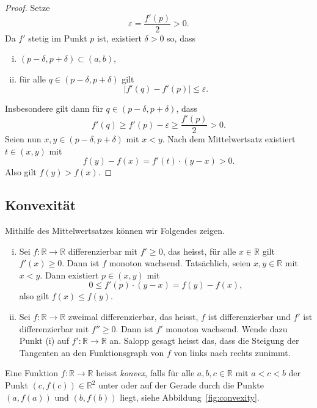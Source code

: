 \documentclass[../main.tex]{subfiles}
\begin{document}
\begin{proof}
  Setze
  \[
    \varepsilon = \frac{f'(p)}{2} > 0.
  \]
  Da $f'$ stetig im Punkt $p$ ist, existiert
  $\delta > 0$ so, dass
  \begin{enumerate}[(i)]
    \item $(p - \delta, p + \delta) \subset (a, b)$,
    \item für alle $q \in (p - \delta, p + \delta)$ 
      gilt
      \[
        |f'(q) - f'(p)| \leq \varepsilon.
      \]
  \end{enumerate}
  Insbesondere gilt dann für
  $q \in (p - \delta, p + \delta)$, dass
  \[
    f'(q) \geq f'(p) - \varepsilon \geq \frac{f'(p)}{2} > 0.
  \]
  Seien nun $x, y \in (p - \delta, p + \delta)$ mit
  $x < y$.
  Nach dem Mittelwertsatz existiert $t \in (x, y)$
  mit 
  \[f(y)  - f(x) = f'(t) \cdot (y - x) > 0. \]
  Also gilt $f(y) > f(x)$.
\end{proof}

\subsection*{Konvexität}
Mithilfe des Mittelwertsatzes können wir Folgendes zeigen.
\begin{enumerate}[(i)]
  \item 
    Sei $f \colon \mathbb{R} \to \mathbb{R}$ differenzierbar
    mit $f' \geq 0$, das heisst, für alle $x \in \mathbb{R}$ 
    gilt $f'(x) \geq 0$.
    Dann ist $f$ monoton wachsend.
    Tatsächlich, seien $x, y \in \mathbb{R}$ mit $x < y$.
    Dann existiert $p \in (x, y)$ mit
    \[
      0 \leq f'(p) \cdot (y - x) = f(y) - f(x),
    \]
    also gilt $f(x) \leq f(y)$.
  \item
    Sei $f \colon \mathbb{R} \to \mathbb{R}$ zweimal
    differenzierbar, das heisst, $f$ ist differenzierbar
    und $f'$ ist differenzierbar mit $f'' \geq 0$.
    Dann ist $f'$ monoton wachsend.
    Wende dazu Punkt (i) auf
    $f' \colon\mathbb{R} \to \mathbb{R}$ 
    an.
    Salopp gesagt heisst das,
    dass die Steigung der Tangenten an den
    Funktionsgraph von $f$ von links nach rechts
    zunimmt.
\end{enumerate}

\begin{definition}
  Eine Funktion $f \colon \mathbb{R} \to \mathbb{R}$ 
  heisst \emph{konvex}, falls für alle $a, b, c \in \mathbb{R}$ 
  mit $a < c < b$ der Punkt
  $(c, f(c))
  \in \mathbb{R}^2$ unter
  oder auf der Gerade durch die Punkte
  $(a, f(a))$ und $(b, f(b))$ liegt,
  siehe Abbildung~\ref{fig:convexity}.
\end{definition}
\end{document}
